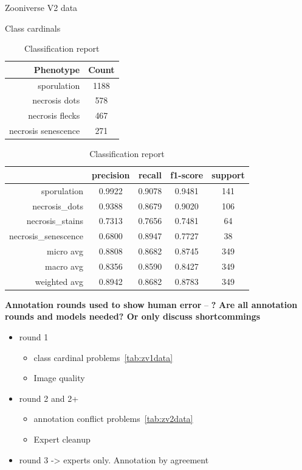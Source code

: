 \documentclass[english]{article}
\begin{document}
\begin{table}[H]
	\caption{Zooniverse V2 data}\label{tab:zv2data}
	\begin{minipage}{0.4\linewidth}
		\centering
		\caption{Class cardinals}\label{tab:zoonv2classcardinals}
		\begin{tabular}{rc}
			\toprule
			Phenotype           & Count \\
			\midrule
			sporulation         & 1188  \\
			necrosis dots       & 578   \\
			necrosis flecks     & 467   \\
			necrosis senescence & 271   \\
			\bottomrule
		\end{tabular}
	\end{minipage}%
	\begin{minipage}{0.4\linewidth}
		\centering
		\caption{Classification report}\label{tab:zv2mcr}
		\begin{tabular}{rcccc}
			\toprule
			{}                   & precision & recall & f1-score & support \\
			\midrule
			sporulation          & 0.9922    & 0.9078 & 0.9481   & 141     \\
			necrosis\_dots       & 0.9388    & 0.8679 & 0.9020   & 106     \\
			necrosis\_stains     & 0.7313    & 0.7656 & 0.7481   & 64      \\
			necrosis\_senescence & 0.6800    & 0.8947 & 0.7727   & 38      \\
			micro avg            & 0.8808    & 0.8682 & 0.8745   & 349     \\
			macro avg            & 0.8356    & 0.8590 & 0.8427   & 349     \\
			weighted avg         & 0.8942    & 0.8682 & 0.8783   & 349     \\
			\bottomrule
		\end{tabular}
	\end{minipage}
\end{table}

\textbf{Annotation rounds used to show human error} -- \textbf{?}
\textbf{Are all annotation rounds and models needed? Or only discuss shortcommings}

\begin{itemize}
	\item round 1
	      \begin{itemize}
		      \item class cardinal problems~\ref*{tab:zv1data}
		      \item Image quality
	      \end{itemize}
	\item round 2 and 2+
	      \begin{itemize}
		      \item annotation conflict problems~\ref*{tab:zv2data}
		      \item Expert cleanup
	      \end{itemize}
	\item round 3 -> experts only. Annotation by agreement
\end{itemize}
\end{document}
